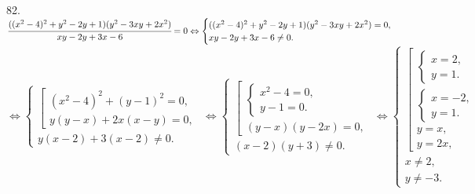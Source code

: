 82. $\cfrac{((x^2-4)^2+y^2-2y+1)(y^2-3xy+2x^2)}{xy-2y+3x-6}=0\Leftrightarrow
\begin{cases}

((x^2-4)^2+y^2-2y+1)(y^2-3xy+2x^2)=0,\\
xy-2y+3x-6\neq0.
\end{cases}$\\$\Leftrightarrow
\begin{cases}
\left[\begin{array}{l}
(x^2-4)^2+(y-1)^2=0,\\
y(y-x)+2x(x-y)=0,
\end{array}\right.\\
y(x-2)+3(x-2)\neq0.
\end{cases}\Leftrightarrow
\begin{cases}
\left[\begin{array}{l}
\begin{cases}
x^2-4=0,\\
y-1=0.
\end{cases}\\
(y-x)(y-2x)=0,
\end{array}\right.\\
(x-2)(y+3)\neq0.
\end{cases}\Leftrightarrow
\begin{cases}
\left[\begin{array}{l}
\begin{cases}
x=2,\\
y=1.
\end{cases}\\
\begin{cases}
x=-2,\\
y=1.
\end{cases}\\
y=x,\\
y=2x,
\end{array}\right.\\
x\neq2,\\
y\neq-3.
\end{cases}$
\begin{figure}[ht!]
\end{figure}\newpage\noindent
